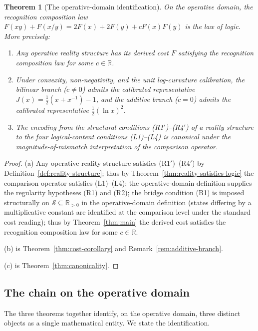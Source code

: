 \documentclass[11pt,a4paper]{article}
\newtheorem{theorem}{Theorem}
\theoremstyle{definition}
\theoremstyle{remark}
\begin{document}
\begin{theorem}[The operative-domain identification]
\label{thm:operative-identification}
On the operative domain, the recognition composition law
$F(xy) + F(x/y) = 2F(x) + 2F(y) + cF(x)F(y)$ is the law of logic.
More precisely:
\begin{enumerate}[label=(\alph*),leftmargin=*]
\item Any operative reality structure has its derived cost $F$
satisfying the recognition composition law for some
$c \in \mathbb{R}$.
\item Under convexity, non-negativity, and the unit log-curvature
calibration, the bilinear branch ($c \neq 0$) admits the calibrated
representative $J(x) = \tfrac{1}{2}(x + x^{-1}) - 1$, and the additive
branch ($c = 0$) admits the calibrated representative
$\tfrac{1}{2}(\ln x)^2$.
\item The encoding from the structural conditions (R1$'$)--(R4$'$) of
a reality structure to the four logical-content conditions
(L1)--(L4) is canonical under the magnitude-of-mismatch
interpretation of the comparison operator.
\end{enumerate}
\end{theorem}

\begin{proof}
(a) Any operative reality structure satisfies (R1$'$)--(R4$'$) by
Definition~\ref{def:reality-structure}; thus by
Theorem~\ref{thm:reality-satisfies-logic} the comparison operator
satisfies (L1)--(L4); the operative-domain definition supplies the
regularity hypotheses (R1) and (R2); the bridge condition (B1) is
imposed structurally on $\mathcal{S} \subseteq \mathbb{R}_{>0}$ in
the operative-domain definition (states differing by a multiplicative
constant are identified at the comparison level under the standard
cost reading); thus by Theorem~\ref{thm:main} the derived cost
satisfies the recognition composition law for some
$c \in \mathbb{R}$.

(b) is Theorem~\ref{thm:cost-corollary} and
Remark~\ref{rem:additive-branch}.

(c) is Theorem~\ref{thm:canonicality}.
\end{proof}

\subsection{The chain on the operative domain}

The three theorems together identify, on the operative domain, three
distinct objects as a single mathematical entity. We state the
identification.
\end{document}
